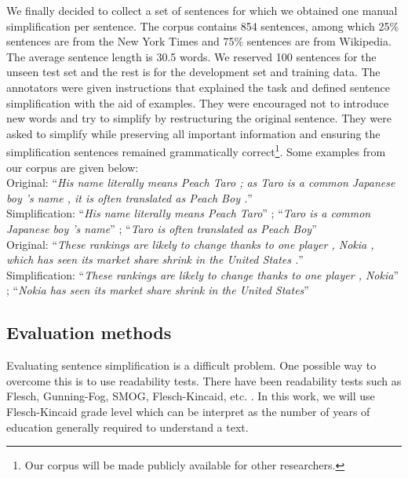 \documentclass[10pt]{article}
\begin{document}
We finally decided to collect a set of sentences for which we obtained one manual simplification per sentence.
The corpus contains 854 sentences, among which 25\% sentences are from the New York Times and 75\% sentences are from Wikipedia. 
The average sentence length is 30.5 words.
We reserved 100 sentences for the unseen test set and the rest is for the development set and training data.
The annotators were given instructions that explained the task and defined sentence simplification with the aid of examples.
They were encouraged not to introduce new words and try to simplify by restructuring the original sentence.
They were asked to simplify while preserving all important information and ensuring the simplification sentences remained grammatically correct\footnote{Our corpus will be made publicly available for other researchers.}. 
Some examples from our corpus are given below:\\

\noindent Original: ``\textit{His name literally means Peach Taro ; as Taro is a common Japanese boy 's name , it is often translated as Peach Boy .}''\\ 
Simplification: ``\textit{His name literally means Peach Taro}'' ; ``\textit{Taro is a common Japanese boy 's name}'' ; ``\textit{Taro is often translated as Peach Boy}''\\

\noindent Original: ``\textit{These rankings are likely to change thanks to one player , Nokia , which has seen its market share shrink in the United States .}''\\
Simplification: ``\textit{These rankings are likely to change thanks to one player , Nokia}'' ; ``\textit{Nokia has seen its market share shrink in the United States}''

\subsection{Evaluation methods}

Evaluating sentence simplification is a difficult problem.
One possible way to overcome this is to use readability tests.
There have been readability tests such as Flesch, Gunning-Fog, SMOG, Flesch-Kincaid, etc. \cite{Flesch:1948,Gunning:1968,SMOG:1969,kincaid:1975}. 
In this work, we will use Flesch-Kincaid grade level which can be interpret as the number of years of education generally required to understand a text.
\end{document}
